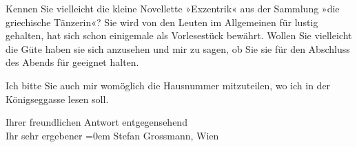 \pstart
           Kennen Sie vielleicht die kleine Novellette »Exzentrik« aus der Sammlung »die griechische
                  Tänzerin«? Sie wird von den Leuten im Allgemeinen für lustig gehalten, hat
               sich schon einigemale als Vorlesestück bewährt. Wollen Sie vielleicht die Güte haben
               sie sich anzusehen und mir zu sagen, ob Sie sie für den Abschluss des Abends für
               geeignet halten.\pend
           
\pstart
           Ich bitte Sie auch mir womöglich die Hausnummer mitzuteilen, wo ich in der Königseggasse lesen soll.\pend
           
\pstart
           Ihrer freundlichen Antwort entgegensehend{\\[\baselineskip]}Ihr sehr ergebener\pend
           \leftskip=0em{}{\vspace{1\baselineskip}}
\pstart
           \noindent{}\label{T_L01718-1v}\label{T_L01718-1} Stefan Grossmann,
                     Wien\pend
           \endnumbering{}  \newcommand{\dateiname}{L01718}\newcommand{\titel}{Arthur Schnitzler an Stefan Großmann, 9. 10. 1907}\newcommand{\editorInnen}{Martin Anton Müller und Gerd-Hermann Susen}
